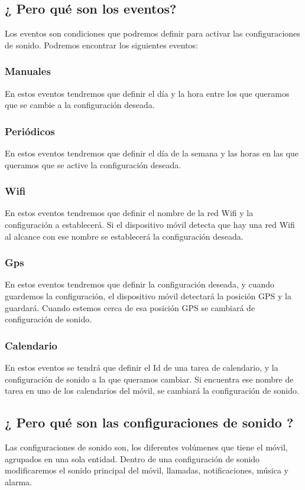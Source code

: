 \subsection{¿ Pero qué son los eventos?}
Los eventos son condiciones que podremos definir para activar las configuraciones de sonido.
Podremos encontrar los siguientes eventos:
\subsubsection{Manuales}
En estos eventos tendremos que definir el día y la hora entre los que queramos que se cambie a la configuración deseada.
\subsubsection{Periódicos}
En estos eventos tendremos que definir el día de la semana y las horas en las que queramos que se active la configuración deseada.
\subsubsection{Wifi}
En estos eventos tendremos que definir el nombre de la red Wifi y la configuración a establecerá. Si el dispositivo móvil detecta que hay una red Wifi al alcance con ese nombre se establecerá la configuración deseada.
\subsubsection{Gps}
En estos eventos tendremos que definir la configuración deseada, y cuando guardemos la configuración, el dispositivo móvil detectará la posición GPS y la guardará. Cuando estemos cerca de esa posición GPS se cambiará de configuración de sonido.
\subsubsection{Calendario}
En estos eventos se tendrá que definir el Id de una tarea de calendario, y la configuración de sonido a la que queramos cambiar. Si encuentra ese nombre de tarea en uno de los calendarios del móvil, se cambiará la configuración de sonido.
\subsection{¿ Pero qué son las configuraciones de sonido ?}
Las configuraciones de sonido son, los diferentes volúmenes que tiene el móvil, agrupados en una sola entidad. Dentro de una configuración de sonido modificaremos el sonido principal del móvil, llamadas, notificaciones, música y alarma.

